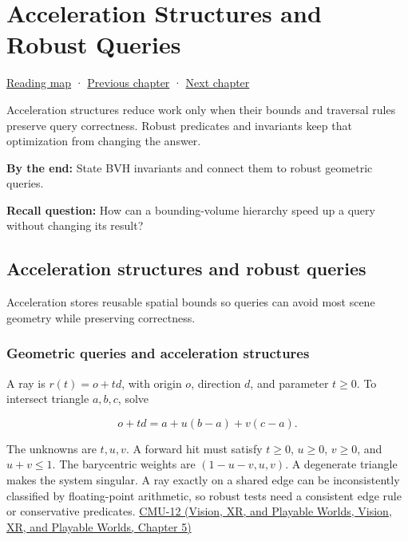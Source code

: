 \hypertarget{04-visual-computing-ii-ch029}{}
\chapter{Acceleration Structures and Robust Queries}\label{stagechapter:04-visual-computing-ii-ch029}\label{04-visual-computing-ii-ch029-acceleration-structures-and-robust-queries}

\hyperref[volume-reading-map]{Reading map} · \hyperref[04-visual-computing-ii-ch028-visibility-queries-and-ray-intersections]{Previous chapter} · \hyperref[04-visual-computing-ii-ch030-mesh-operators-boundaries-and-diffusion]{Next chapter}

Acceleration structures reduce work only when their bounds and traversal rules preserve query correctness. Robust predicates and invariants keep that optimization from changing the answer.

\textbf{By the end:} State BVH invariants and connect them to robust geometric queries.

\textbf{Recall question:} How can a bounding-volume hierarchy speed up a query without changing its result?

\section{Acceleration structures and robust queries}\label{04-visual-computing-ii-ch029-acceleration-structures-and-robust-queries-1}

Acceleration stores reusable spatial bounds so queries can avoid most scene geometry while preserving correctness.

\subsection{Geometric queries and acceleration structures}\label{04-visual-computing-ii-ch029-geometric-queries-and-acceleration-structures}

A ray is \(r(t)=o+td\), with origin \(o\), direction \(d\), and parameter \(t\ge0\). To intersect triangle \(a,b,c\), solve

\[
o+td=a+u(b-a)+v(c-a).
\]

The unknowns are \(t,u,v\). A forward hit must satisfy \(t\ge0\), \(u\ge0\), \(v\ge0\), and \(u+v\le1\). The barycentric weights are \((1-u-v,u,v)\). A degenerate triangle makes the system singular. A ray exactly on a shared edge can be inconsistently classified by floating-point arithmetic, so robust tests need a consistent edge rule or conservative predicates. \href{../07-Vision-XR-and-Playable-Worlds/main.pdf\#nameddest=04-visual-computing-ii-ch036-cmu-12---geometric-queries}{CMU-12 (Vision, XR, and Playable Worlds, Vision, XR, and Playable Worlds, Chapter 5)}

